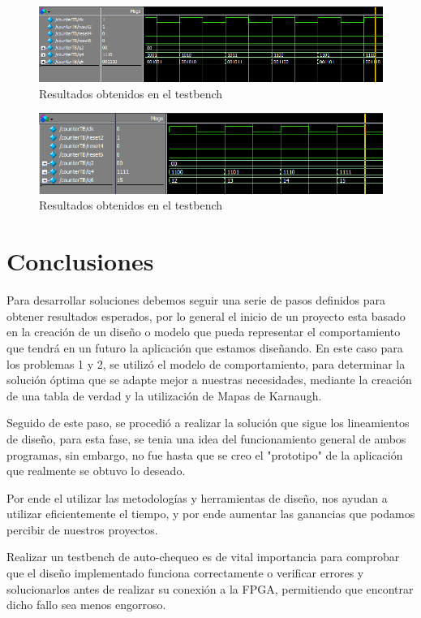 \documentclass[journal]{IEEEtran}
\begin{document}
	\begin{figure}[htb]
		\centering
		\includegraphics[scale = 0.3]{img/p3/rd.png}
		\caption{Resultados obtenidos en el testbench}
		\label{fig:rd}
	\end{figure}
	
	\begin{figure}[!htb]
		\centering
		\includegraphics[scale = 0.4]{img/p3/r15.png}
		\caption{Resultados obtenidos en el testbench}
		\label{fig:r15}
	\end{figure}
	
	\section{Conclusiones}
	Para desarrollar soluciones debemos seguir una serie de pasos definidos para obtener resultados esperados, por lo general el inicio de un proyecto esta basado en la creación de un diseño o modelo que pueda representar el comportamiento que tendrá en un futuro la aplicación que estamos diseñando. En este caso para los problemas 1 y 2, se utilizó el modelo de comportamiento, para determinar la solución óptima que se adapte mejor a nuestras necesidades, mediante la creación de una tabla de verdad y la utilización de Mapas de Karnaugh. 
	
	Seguido de este paso, se procedió a realizar la solución que sigue los lineamientos de diseño, para esta fase, se tenia una idea del funcionamiento general de ambos programas, sin embargo, no fue hasta que se creo el "prototipo" de la aplicación que realmente se obtuvo lo deseado. 
	
	Por ende el utilizar las metodologías y herramientas de diseño, nos ayudan a utilizar eficientemente el tiempo, y por ende aumentar las ganancias que podamos percibir de nuestros proyectos.
	
	Realizar un testbench de auto-chequeo es de vital importancia para comprobar que el diseño implementado funciona correctamente o verificar errores y solucionarlos antes de realizar su conexión a la FPGA, permitiendo que encontrar dicho fallo sea menos engorroso.
	
\end{document}
